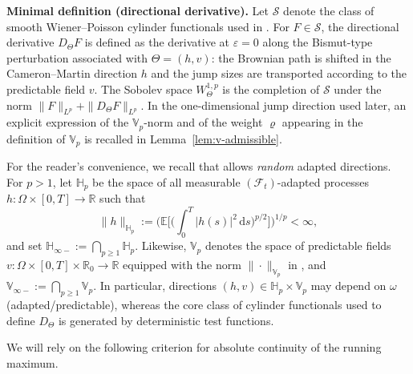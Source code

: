 \documentclass[11pt]{article}
\newcommand{\R}{\mathbb{R}}
\newcommand{\E}{\mathbb{E}}
\newcommand{\Hb}{\mathbb{H}}
\newcommand{\Vb}{\mathbb{V}}
\newcommand{\1}{\mathbf{1}}
\newcommand{\dd}{\mathrm{d}}
\theoremstyle{plain}
\theoremstyle{definition}
\theoremstyle{remark}
\begin{document}
\medskip
\noindent\textbf{Minimal definition (directional derivative).}
Let $\mathcal{S}$ denote the class of smooth Wiener--Poisson cylinder functionals used in \cite[Definition~3.1]{NakagawaSuzuki2024}.
For $F\in\mathcal{S}$, the directional derivative $D_\Theta F$ is defined as the derivative at $\varepsilon=0$
along the Bismut-type perturbation associated with $\Theta=(h,v)$: the Brownian path is shifted in the Cameron--Martin direction $h$
and the jump sizes are transported according to the predictable field $v$.
The Sobolev space $W^{1,p}_\Theta$ is the completion of $\mathcal{S}$ under the norm $\|F\|_{L^p}+\|D_\Theta F\|_{L^p}$.
In the one-dimensional jump direction used later, an explicit expression of the $\Vb_p$-norm and of the weight $\varrho$
appearing in the definition of $\Vb_p$ is recalled in Lemma~\ref{lem:v-admissible}.

For the reader's convenience, we recall that \cite{NakagawaSuzuki2024} allows \emph{random} adapted directions.
For $p>1$, let $\Hb_p$ be the space of all measurable $(\mathcal{F}_t)$-adapted processes $h:\Omega\times[0,T]\to\R$ such that
\[
\|h\|_{\Hb_p}:=\Big(\E\Big[\Big(\int_0^T |h(s)|^2\,\dd s\Big)^{p/2}\Big]\Big)^{1/p}<\infty,
\]
and set $\Hb_{\infty-}:=\bigcap_{p\ge1}\Hb_p$.
Likewise, $\Vb_p$ denotes the space of predictable fields $v:\Omega\times[0,T]\times\R_0\to\R$
equipped with the norm $\|\cdot\|_{\Vb_p}$ in \cite[Section~3]{NakagawaSuzuki2024}, and $\Vb_{\infty-}:=\bigcap_{p\ge1}\Vb_p$.
In particular, directions $(h,v)\in \Hb_p\times \Vb_p$ may depend on $\omega$ (adapted/predictable), whereas the core class of cylinder
functionals used to define $D_\Theta$ is generated by deterministic test functions.

We will rely on the following criterion for absolute continuity of the running maximum.
\end{document}
